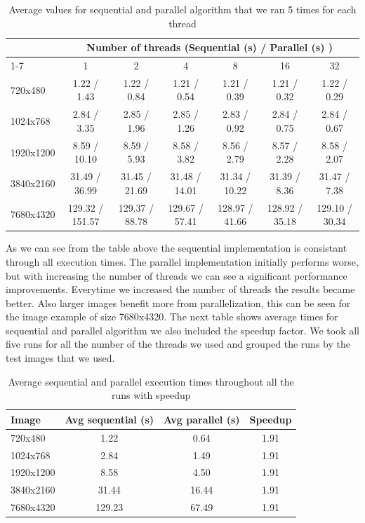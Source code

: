 \documentclass[9pt,onecolumn]{IEEEtran}
\begin{document}
\begin{table}[H]
\centering
\small
\begin{tabular}{lcccccc}
\toprule
 & \multicolumn{6}{c}{Number of threads (Sequential (s) / Parallel (s) )} \\
\cmidrule(lr){1-7}
 & 1 & 2 & 4 & 8 & 16 & 32 \\
\midrule
720x480
& 1.22 / 1.43 & 1.22 / 0.84 & 1.21 / 0.54 
& 1.21 / 0.39 & 1.21 / 0.32 & 1.22 / 0.29 \\

1024x768
& 2.84 / 3.35 & 2.85 / 1.96 & 2.85 / 1.26 
& 2.83 / 0.92 & 2.84 / 0.75 & 2.84 / 0.67 \\

1920x1200
& 8.59 / 10.10 & 8.59 / 5.93 & 8.58 / 3.82 
& 8.56 / 2.79 & 8.57 / 2.28 & 8.58 / 2.07 \\

3840x2160
& 31.49 / 36.99 & 31.45 / 21.69 & 31.48 / 14.01 
& 31.34 / 10.22 & 31.39 / 8.36 & 31.47 / 7.38 \\

7680x4320
& 129.32 / 151.57 & 129.37 / 88.78 & 129.67 / 57.41 
& 128.97 / 41.66 & 128.92 / 35.18 & 129.10 / 30.34 \\

\bottomrule
\end{tabular}
\caption{Average values for sequential and parallel algorithm that we ran 5 times for each thread}
\end{table}

As we can see from the table above the sequential implementation is consistant through all execution times. The parallel implementation initially performs worse, but with increasing the number of threads we can see a significant performance improvements. Everytime we increased the number of threads the results became better. Also larger images benefit more from parallelization, this can be seen for the image example of size 7680x4320. The next table shows average times for sequential and parallel algorithm we also included the speedup factor. We took all five runs for all the number of the threads we used and grouped the runs by the test images that we used.

\begin{table}[h]
\centering
\begin{tabular}{lccc}
\toprule
Image & Avg sequential (s) & Avg parallel (s) & Speedup\\
\midrule
720x480 & 1.22 & 0.64 & 1.91 \\
1024x768 & 2.84 & 1.49 & 1.91 \\
1920x1200 & 8.58 & 4.50 & 1.91 \\
3840x2160 & 31.44 & 16.44 & 1.91 \\
7680x4320 & 129.23 & 67.49 & 1.91 \\
\bottomrule
\end{tabular}
\caption{Average sequential and parallel execution times throughout all the runs with speedup}
\end{table}
\end{document}

